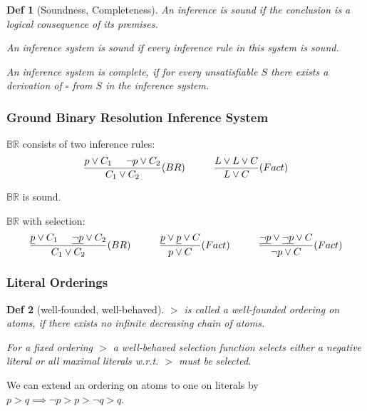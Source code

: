 \documentclass[]{article}
\newtheorem*{definition*}{Def}
\begin{document}
\begin{definition*}[Soundness, Completeness]
	An inference is sound if the conclusion is a logical consequence of its premises.
	
	An inference system is sound if every inference rule in this system is sound.
	
	An inference system is complete, if for every unsatisfiable $S$ there exists a derivation of $\square$ from $S$ in the inference system.
\end{definition*}

\subsubsection{Ground Binary Resolution Inference System}

$\mathbb{BR}$ consists of two inference rules:
\begin{align*}
	\frac{p\lor C_1 \hspace{.5cm} \lnot p \lor C_2}{C_1 \lor C_2} (BR) \hspace{1cm} \frac{L\lor L \lor C}{L \lor C} (Fact)
\end{align*}

$\mathbb{BR}$ is sound.

$\mathbb{BR}$ with selection:
\begin{align*}
	\frac{\underline{p}\lor C_1 \hspace{.5cm} \underline{\lnot p} \lor C_2}{C_1 \lor C_2} (BR) \hspace{1cm} \frac{\underline{p}\lor \underline{p} \lor C}{p \lor C} (Fact) \hspace{1cm} \frac{\underline{\lnot p}\lor \underline{\lnot p} \lor C}{\lnot p \lor C} (Fact)
\end{align*}

\subsubsection{Literal Orderings}

\begin{definition*}[well-founded, well-behaved]
	$>$ is called a well-founded ordering on atoms, if there exists no infinite decreasing chain of atoms.
	
	For a fixed ordering $>$ a well-behaved selection function selects either a negative literal or all maximal literals w.r.t. $>$ must be selected.
\end{definition*}

We can extend an ordering on atoms to one on literals by $p>q \implies \lnot p > p > \lnot q > q$.
\end{document}
